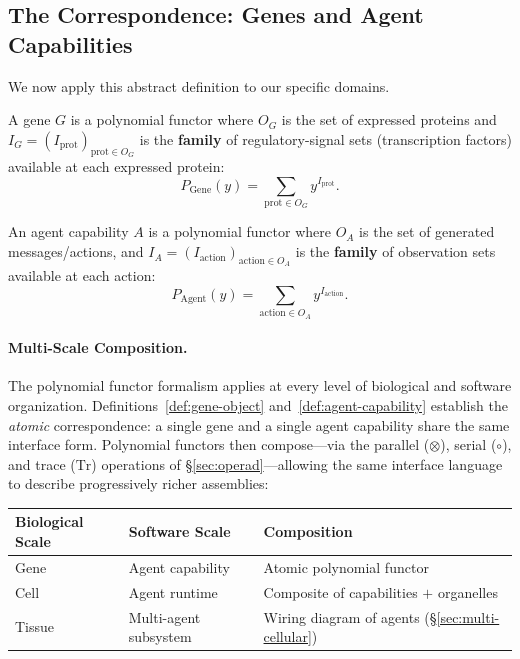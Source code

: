 \subsection{The Correspondence: Genes and Agent Capabilities}

We now apply this abstract definition to our specific domains.

\begin{definition}\label{def:gene-object}
A gene $G$ is a polynomial functor where $O_G$ is the set of expressed proteins and
$I_G=(I_{\text{prot}})_{\text{prot}\in O_G}$ is the \textbf{family} of regulatory-signal sets (transcription factors)
available at each expressed protein:
\begin{equation}
P_{\text{Gene}}(y) = \sum_{\text{prot}\in O_G} y^{I_{\text{prot}}}.
\label{eq:poly-gene}
\end{equation}
\end{definition}

\begin{definition}\label{def:agent-capability}
An agent capability $A$ is a polynomial functor where $O_A$ is the set of generated messages/actions, and
$I_A=(I_{\text{action}})_{\text{action}\in O_A}$ is the \textbf{family} of observation sets available at each action:
\begin{equation}
P_{\text{Agent}}(y) = \sum_{\text{action}\in O_A} y^{I_{\text{action}}}.
\label{eq:poly-agent}
\end{equation}
\end{definition}

\paragraph{Multi-Scale Composition.}
The polynomial functor formalism applies at every level of biological and software organization. Definitions~\ref{def:gene-object} and~\ref{def:agent-capability} establish the \textit{atomic} correspondence: a single gene and a single agent capability share the same interface form. Polynomial functors then compose---via the parallel ($\otimes$), serial ($\circ$), and trace ($\mathrm{Tr}$) operations of \S\ref{sec:operad}---allowing the same interface language to describe progressively richer assemblies:

\begin{center}
\small
\begin{tabular}{@{}lll@{}}
\toprule
\textbf{Biological Scale} & \textbf{Software Scale} & \textbf{Composition}\\
\midrule
Gene & Agent capability & Atomic polynomial functor\\
Cell & Agent runtime & Composite of capabilities $+$ organelles\\
Tissue & Multi-agent subsystem & Wiring diagram of agents (\S\ref{sec:multi-cellular})\\
\bottomrule
\end{tabular}
\end{center}

